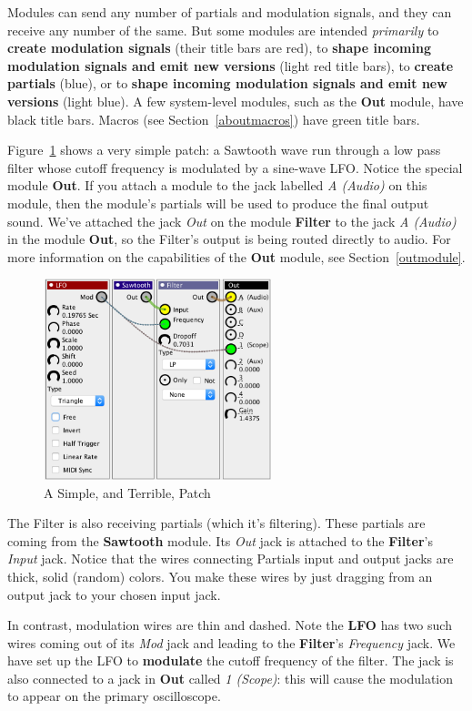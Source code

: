 \documentclass{article}
\begin{document}
Modules can send any number of partials and modulation signals, and they can receive any number of the same.  But some modules are intended {\it primarily} to {\bf create modulation signals} (their title bars are red), to {\bf shape incoming modulation signals and emit new versions} (light red title bars), to {\bf create partials} (blue), or to {\bf shape incoming modulation signals and emit new versions} (light blue).  A few system-level modules, such as the {\bf Out} module, have black title bars.  Macros (see Section~\ref{aboutmacros}) have green title bars.

Figure~\ref{simplepatch} shows a very simple patch: a Sawtooth wave run through a low pass filter whose cutoff frequency is modulated by a sine-wave LFO.   Notice the special module {\bf Out}.  If you attach a module to the jack labelled {\it A (Audio)} on this module, then the module's partials will be used to produce the final output sound.  We've attached the jack {\it Out} on the module {\bf Filter} to the jack {\it A (Audio)} in the module {\bf Out}, so the Filter's output is being routed directly to audio.   For more information on the capabilities of the {\bf Out} module, see Section~\ref{outmodule}.

\begin{figure}
\includegraphics[width=2.6in]{simplepatch.png}
\caption{A Simple, and Terrible, Patch}
\vspace{-1em}
\label{simplepatch}
\end{figure}

The Filter is also receiving partials (which it's filtering).  These partials are coming from the {\bf Sawtooth} module.  Its {\it Out} jack is attached to the {\bf Filter}'s {\it Input} jack.  Notice that the wires connecting Partials input and output jacks are thick, solid (random) colors.  You make these wires by just dragging from an output jack to your chosen input jack.

In contrast, modulation wires are thin and dashed.  Note the {\bf LFO} has two such wires coming out of its {\it Mod} jack and leading to the {\bf Filter}'s {\it Frequency} jack.  We have set up the LFO to {\bf modulate} the cutoff frequency of the filter.
The jack is also connected to a jack in {\bf Out} called {\it 1 (Scope)}: this will cause the modulation to appear on the primary oscilloscope.  
\end{document}
